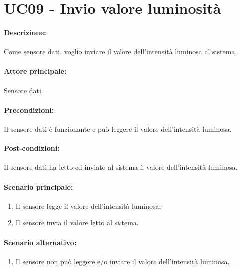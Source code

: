 \section{UC09 - Invio valore luminosità}

\paragraph{Descrizione:}
Come sensore dati, voglio inviare il valore dell'intensità luminosa al sistema.

\paragraph{Attore principale:}
Sensore dati.

\paragraph{Precondizioni:}
Il sensore dati è funzionante e può leggere il valore dell'intensità luminosa.

\paragraph{Post-condizioni:}
Il sensore dati ha letto ed inviato al sistema il valore dell'intensità luminosa.

\paragraph{Scenario principale:}
\begin{enumerate}
    \item Il sensore legge il valore dell'intensità luminosa;
    \item Il sensore invia il valore letto al sistema.
\end{enumerate}

\paragraph{Scenario alternativo:}
\begin{enumerate}
    \item Il sensore non può leggere e/o inviare il valore dell'intensità luminosa.
\end{enumerate}